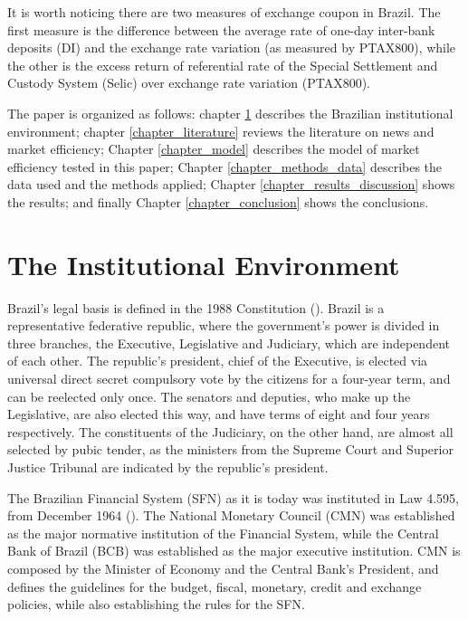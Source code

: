 \documentclass[cic,tc, english]{iiufrgs}
\begin{document}
    It is worth noticing there are two measures of exchange coupon in Brazil. The first measure is the difference between the average rate of one-day inter-bank deposits (DI) and the exchange rate variation (as measured by PTAX800), while the other is the excess return of referential rate of the Special Settlement and Custody System (Selic) over exchange rate variation (PTAX800). 
  
    The paper is organized as follows: chapter \ref{chapter_institutional} describes the Brazilian institutional environment; chapter \ref{chapter_literature} reviews the literature on news and market efficiency; Chapter \ref{chapter_model} describes the model of market efficiency tested in this paper; Chapter \ref{chapter_methods_data} describes the data used and the methods applied; Chapter \ref{chapter_results_discussion} shows the results; and finally Chapter \ref{chapter_conclusion} shows the conclusions.

\chapter{The Institutional Environment} \label{chapter_institutional}

    Brazil's legal basis is defined in the 1988 Constitution (\citet{constituicao}). Brazil is a representative federative republic, where the government's power is divided in three branches, the Executive, Legislative and Judiciary, which are independent of each other. The republic's president, chief of the Executive, is elected via universal direct secret compulsory vote by the citizens for a four-year term, and can be reelected only once. The senators and deputies, who make up the Legislative, are also elected this way, and have terms of eight and four years respectively. The constituents of the Judiciary, on the other hand, are almost all selected by pubic tender, as the ministers from the Supreme Court and Superior Justice Tribunal are indicated by the republic's president.

    The Brazilian Financial System (SFN) as it is today was instituted in Law 4.595, from December 1964 (\citet{lei4595}). The National Monetary Council (CMN) was established as the major normative institution of the Financial System, while the Central Bank of Brazil (BCB) was established as the major executive institution. CMN is composed by the Minister of Economy and the Central Bank's President, and defines the guidelines for the budget, fiscal, monetary, credit and exchange policies, while also establishing the rules for the SFN.
\end{document}
